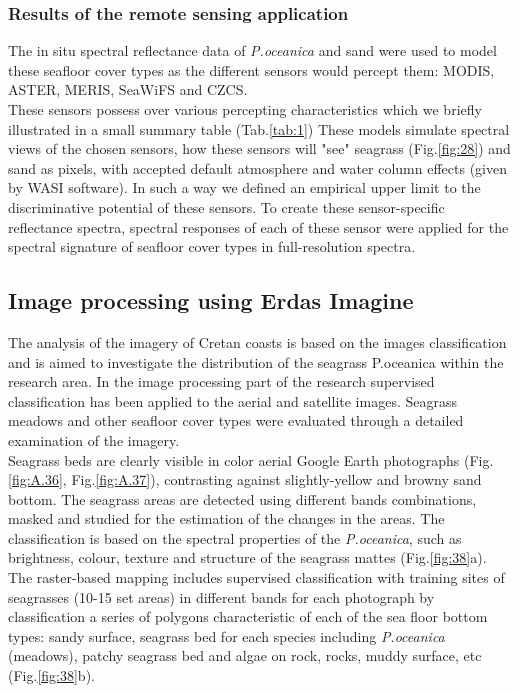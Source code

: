 \documentclass[10pt, a4paper]{article}
\begin{document}
\subsubsection{Results of the remote sensing application}
The in situ spectral reflectance data of \textit{P.oceanica} and sand were used to model these seafloor cover
types as the different sensors would percept them: MODIS, ASTER, MERIS, SeaWiFS and CZCS.\\
These sensors possess over various percepting characteristics which we briefly illustrated in a small summary table (Tab.\ref{tab:1})
These models simulate spectral views of the chosen sensors, how these sensors will "see" seagrass (Fig.\ref{fig:28}) and sand as
pixels, with accepted default atmosphere and water column effects (given by WASI software). In such
a way we defined an empirical upper limit to the discriminative potential of these sensors. To create
these sensor-specific reflectance spectra, spectral responses of each of these sensor were applied for
the spectral signature of seafloor cover types in full-resolution spectra.

\subsection{Image processing using Erdas Imagine}
The analysis of the imagery of Cretan coasts is based on the images classification and is aimed to
investigate the distribution of the seagrass P.oceanica within the research area.
In the image processing part of the research supervised classification has been applied to the aerial
and satellite images. Seagrass meadows and other seafloor cover types were evaluated through a
detailed examination of the imagery. \\
Seagrass beds are clearly visible in color aerial Google Earth
photographs (Fig.\ref{fig:A.36}, Fig.\ref{fig:A.37}), contrasting against slightly-yellow and browny sand bottom. The seagrass areas are
detected using different bands combinations, masked and studied for the estimation of the changes in
the areas. The classification is based on the spectral properties of the \textit{P.oceanica}, such as brightness,
colour, texture and structure of the seagrass mattes (Fig.\ref{fig:38}a). The raster-based mapping
includes supervised classification with training sites of seagrasses (10-15 set areas) in different bands
for each photograph by classification a series of polygons characteristic of each of the sea floor
bottom types: sandy surface, seagrass bed for each species including \textit{P.oceanica} (meadows), patchy
seagrass bed and algae on rock, rocks, muddy surface, etc (Fig.\ref{fig:38}b).
\end{document}

